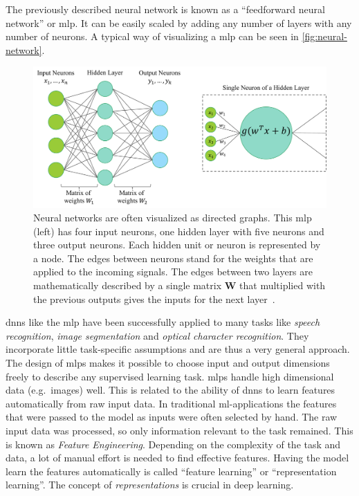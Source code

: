 The previously described neural network is known as a \enquote{feedforward neural network} or \gls{mlp}.
It can be easily scaled by adding any number of layers with any number of neurons.
A typical way of visualizing a \gls{mlp} can be seen in \autoref{fig:neural-network}.
\begin{figure}
    \centering
    \includegraphics[width=\linewidth]{images/nn}
    \caption[Visualization of a neural network.]{Neural networks are often visualized as directed graphs. This \gls{mlp} (left) has four input neurons, one hidden layer with five neurons and three output neurons. Each hidden unit or neuron is represented by a node. The edges between neurons stand for the weights that are applied to the incoming signals. The edges between two layers are mathematically described by a single matrix $\boldsymbol{W}$ that multiplied with the previous outputs gives the inputs for the next layer~\autocite{sonnet2022NeuralBoook, Goodfellow-et-al-2016}.}
    \label{fig:neural-network}
\end{figure}

\glspl{dnn} like the \gls{mlp} have been successfully applied to many tasks like \textit{speech recognition}, \textit{image segmentation} and \textit{optical character recognition}.
They incorporate little task-specific assumptions and are thus a very general approach.
The design of \glspl{mlp} makes it possible to choose input and output dimensions freely to describe any supervised learning task.
\glspl{mlp} handle high dimensional data (e.g.\ images) well.
This is related to the ability of \glspl{dnn} to learn features automatically from raw input data.
In traditional \gls{ml}-applications the features that were passed to the model as inputs were often selected by hand.
The raw input data was processed, so only information relevant to the task remained.
This is known as \textit{Feature Engineering}.
Depending on the complexity of the task and data, a lot of manual effort is needed to find effective features.
Having the model learn the features automatically is called \enquote{feature learning} or \enquote{representation learning}.
The concept of \textit{representations} is crucial in deep learning.

